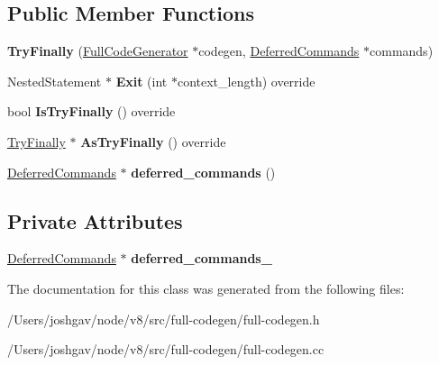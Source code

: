 \subsection*{Public Member Functions}
\begin{DoxyCompactItemize}
\item 
{\bfseries Try\+Finally} (\hyperlink{classv8_1_1internal_1_1_full_code_generator}{Full\+Code\+Generator} $\ast$codegen, \hyperlink{classv8_1_1internal_1_1_full_code_generator_1_1_deferred_commands}{Deferred\+Commands} $\ast$commands)\hypertarget{classv8_1_1internal_1_1_full_code_generator_1_1_try_finally_a9cab75b72bc7878a96cb304401e65867}{}\label{classv8_1_1internal_1_1_full_code_generator_1_1_try_finally_a9cab75b72bc7878a96cb304401e65867}

\item 
Nested\+Statement $\ast$ {\bfseries Exit} (int $\ast$context\+\_\+length) override\hypertarget{classv8_1_1internal_1_1_full_code_generator_1_1_try_finally_af0db7f78643fcc8553b8c63fca3180bf}{}\label{classv8_1_1internal_1_1_full_code_generator_1_1_try_finally_af0db7f78643fcc8553b8c63fca3180bf}

\item 
bool {\bfseries Is\+Try\+Finally} () override\hypertarget{classv8_1_1internal_1_1_full_code_generator_1_1_try_finally_af30972a4420e1180d5c24f03959194db}{}\label{classv8_1_1internal_1_1_full_code_generator_1_1_try_finally_af30972a4420e1180d5c24f03959194db}

\item 
\hyperlink{classv8_1_1internal_1_1_full_code_generator_1_1_try_finally}{Try\+Finally} $\ast$ {\bfseries As\+Try\+Finally} () override\hypertarget{classv8_1_1internal_1_1_full_code_generator_1_1_try_finally_a3303def01b19050bafa86ba84e115b82}{}\label{classv8_1_1internal_1_1_full_code_generator_1_1_try_finally_a3303def01b19050bafa86ba84e115b82}

\item 
\hyperlink{classv8_1_1internal_1_1_full_code_generator_1_1_deferred_commands}{Deferred\+Commands} $\ast$ {\bfseries deferred\+\_\+commands} ()\hypertarget{classv8_1_1internal_1_1_full_code_generator_1_1_try_finally_ad4233858f64e451362c7639d8763f295}{}\label{classv8_1_1internal_1_1_full_code_generator_1_1_try_finally_ad4233858f64e451362c7639d8763f295}

\end{DoxyCompactItemize}
\subsection*{Private Attributes}
\begin{DoxyCompactItemize}
\item 
\hyperlink{classv8_1_1internal_1_1_full_code_generator_1_1_deferred_commands}{Deferred\+Commands} $\ast$ {\bfseries deferred\+\_\+commands\+\_\+}\hypertarget{classv8_1_1internal_1_1_full_code_generator_1_1_try_finally_a2260b80e11490806cef9d393b1688d5f}{}\label{classv8_1_1internal_1_1_full_code_generator_1_1_try_finally_a2260b80e11490806cef9d393b1688d5f}

\end{DoxyCompactItemize}


The documentation for this class was generated from the following files\+:\begin{DoxyCompactItemize}
\item 
/\+Users/joshgav/node/v8/src/full-\/codegen/full-\/codegen.\+h\item 
/\+Users/joshgav/node/v8/src/full-\/codegen/full-\/codegen.\+cc\end{DoxyCompactItemize}

